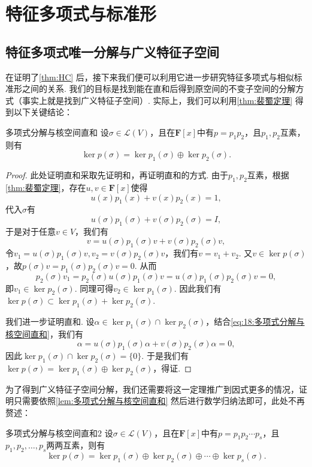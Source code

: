 \section{特征多项式与标准形}
\subsection{特征多项式唯一分解与广义特征子空间}

在证明了\autoref{thm:HC} 后，接下来我们便可以利用它进一步研究特征多项式与相似标准形之间的关系. 我们的目标是找到能在直和后得到原空间的不变子空间的分解方式（事实上就是找到广义特征子空间）. 实际上，我们可以利用\autoref{thm:裴蜀定理} 得到以下关键结论：
\begin{lemma}{}{多项式分解与核空间直和}
    设$\sigma\in \mathcal{L}(V)$，且在$\mathbf{F}[x]$中有$p=p_1p_2$，且$p_1,p_2$互素，则有
    \[\ker p(\sigma)=\ker p_1(\sigma)\oplus\ker p_2(\sigma).\]
\end{lemma}

\begin{proof}
    此处证明直和采取先证明和，再证明直和的方式. 由于$p_1,p_2$互素，根据\autoref{thm:裴蜀定理}，存在$u,v\in\mathbf{F}[x]$使得
    \[u(x)p_1(x)+v(x)p_2(x)=1,\]
    代入$\sigma$有
    \[u(\sigma)p_1(\sigma)+v(\sigma)p_2(\sigma)=I,\]
    于是对于任意$v\in V$，我们有
    \begin{equation} \label{eq:18:多项式分解与核空间直和}
        v=u(\sigma)p_1(\sigma)v+v(\sigma)p_2(\sigma)v,
    \end{equation}
    令$v_1=u(\sigma)p_1(\sigma)v,v_2=v(\sigma)p_2(\sigma)v$，我们有$v=v_1+v_2$. 又$v\in \ker p(\sigma)$，故$p(\sigma)v=p_1(\sigma)p_2(\sigma)v=0$. 从而
    \[p_2(\sigma)v_1=p_2(\sigma)u(\sigma)p_1(\sigma)v=u(\sigma)p_1(\sigma)p_2(\sigma)v=0,\]
    即$v_1\in \ker p_2(\sigma)$. 同理可得$v_2\in \ker p_1(\sigma)$. 因此我们有$\ker p(\sigma)\subset \ker p_1(\sigma)+\ker p_2(\sigma)$.

    我们进一步证明直和. 设$\alpha\in \ker p_1(\sigma)\cap \ker p_2(\sigma)$，结合\autoref{eq:18:多项式分解与核空间直和}，我们有
    \[\alpha=u(\sigma)p_1(\sigma)\alpha+v(\sigma)p_2(\sigma)\alpha=0,\]
    因此$\ker p_1(\sigma)\cap \ker p_2(\sigma)=\{0\}$. 于是我们有$\ker p(\sigma)=\ker p_1(\sigma)\oplus\ker p_2(\sigma)$，得证.
\end{proof}

为了得到广义特征子空间分解，我们还需要将这一定理推广到因式更多的情况，证明只需要依照\autoref{lem:多项式分解与核空间直和} 然后进行数学归纳法即可，此处不再赘述：
\begin{corollary}{}{多项式分解与核空间直和2}
    设$\sigma\in \mathcal{L}(V)$，且在$\mathbf{F}[x]$中有$p=p_1p_2\cdots p_s$，且$p_1,p_2,\ldots,p_s$两两互素，则有\[\ker p(\sigma)=\ker p_1(\sigma)\oplus\ker p_2(\sigma)\oplus\cdots\oplus\ker p_s(\sigma).\]
\end{corollary}

